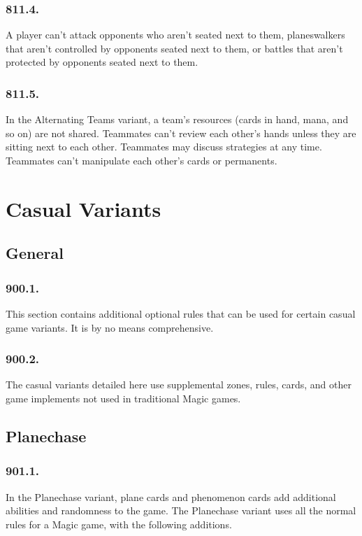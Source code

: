 \subsection*{811.4.}
A player can’t attack opponents who aren’t seated next to them, planeswalkers that aren’t controlled by opponents seated next to them, or battles that aren’t protected by opponents seated next to them.

\subsection*{811.5.}
In the Alternating Teams variant, a team’s resources (cards in hand, mana, and so on) are not shared. Teammates can’t review each other’s hands unless they are sitting next to each other. Teammates may discuss strategies at any time. Teammates can’t manipulate each other’s cards or permanents.

\chapter{Casual Variants}
\setcounter{section}{899}
\section{General}
\subsection*{900.1.}
This section contains additional optional rules that can be used for certain casual game variants. It is by no means comprehensive.

\subsection*{900.2.}
The casual variants detailed here use supplemental zones, rules, cards, and other game implements not used in traditional Magic games.

\section{Planechase}
\subsection*{901.1.}
In the Planechase variant, plane cards and phenomenon cards add additional abilities and randomness to the game. The Planechase variant uses all the normal rules for a Magic game, with the following additions.

